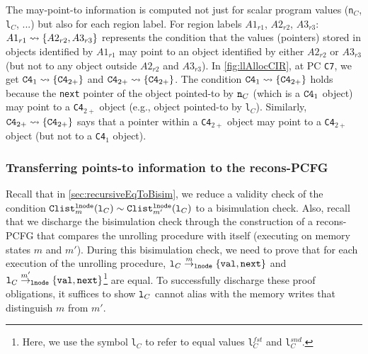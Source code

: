 The may-point-to information is computed not
just for scalar program values ({\tt n}$_C$,
{\tt l}$_C$, ...) but also for each region label.
For region labels $A1_{r1}$, $A2_{r2}$, $A3_{r3}$:
$A1_{r1}\rightsquigarrow{}\{A2_{r2},A3_{r3}\}$ represents
the condition that the values (pointers) stored
in objects identified
by $A1_{r1}$ may point to an object identified by
either $A2_{r2}$ or $A3_{r3}$ (but not to any object
outside $A2_{r2}$ and $A3_{r3}$).
In \cref{fig:llAllocCIR}, at PC {\tt C7}, we
get
${\tt C4}_{1}\rightsquigarrow{}\{{\tt C4}_{2+}\}$ and
${\tt C4}_{2+}\rightsquigarrow{}\{{\tt C4}_{2+}\}$.
The condition
${\tt C4}_{1}\rightsquigarrow{}\{{\tt C4}_{2+}\}$
holds because the {\tt next} pointer of the object
pointed-to by ${\tt n}_C$ (which
is a ${\tt C4}_1$ object) may point to
a {\tt C4}$_{2+}$ object (e.g., object pointed-to
by {\tt l}$_C$).
Similarly, ${\tt C4}_{2+}\rightsquigarrow{}\{{\tt C4}_{2+}\}$
says that a pointer within a {\tt C4}$_{2+}$ object
may point to a {\tt C4}$_{2+}$
object (but not to a {\tt C4}$_1$ object).

\subsubsection{Transferring points-to information to the recons-PCFG}
\label{sec:pointsToAsInvariants}
Recall that
in \cref{sec:recursiveEqToBisim},
we reduce a validity check of the condition
${\tt Clist}_m^{{\tt lnode}}({\tt l}_C)
\sim{} {\tt Clist}_{m'}^{{\tt lnode}}({\tt l}_C)$
to a bisimulation check. Also, recall
that we discharge the bisimulation check through the construction
of a recons-PCFG that compares the unrolling procedure with itself (executing
on memory states $m$ and $m'$).
During this bisimulation check, we need to prove
that for each execution
of the unrolling procedure, ${{\tt l}_C} \overset{m}{\rightarrow}_{{\tt \tt lnode}} {{{\tt \{val,next\}}}}$
and ${{\tt l}_C} \overset{m'}{\rightarrow}_{{\tt \tt lnode}} {{{\tt \{val,next\}}}}$\footnote{Here, we use the symbol {\tt l}$_C$ to
refer to equal values {\tt l}$^{fst}_C$ and
{\tt l}$^{snd}_C$.} are equal.
To successfully discharge these proof obligations, it suffices
to show ${\tt l}_C$ cannot alias with the memory writes that
distinguish $m$ from $m'$.

